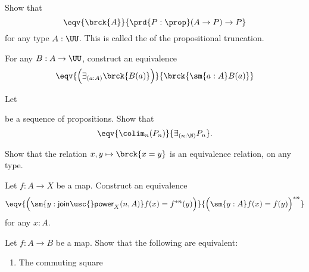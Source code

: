 \begin{exercises}
\item Show that
\begin{equation*}
\eqv{\brck{A}}{\prd{P:\prop}(A\to P)\to P}
\end{equation*}
for any type $A:\UU$. This is called the  of the propositional truncation.
\item For any $B:A\to\UU$, construct an equivalence
\begin{equation*}
\eqv{\Big(\exists_{(a:A)}\brck{B(a)}\Big)}{\brck{\sm{a:A}B(a)}}
\end{equation*}
\item Let
be a sequence of propositions. Show that
\begin{equation*}
\eqv{\colim_n(P_n)}{\exists_{(n:\N)} P_n}.
\end{equation*}
\item Show that the relation $x,y\mapsto\brck{x=y}$ is an equivalence relation, on any type.
\item Let $f:A\to X$ be a map. Construct an equivalence
\begin{equation*}
\eqv{\Big(\sm{y:\mathsf{join\usc{}power}_X(n,A)}f(x)=f^{\ast n}(y)\Big)}{\Big(\sm{y:A}f(x)=f(y)\Big)^{\ast n}}
\end{equation*}
for any $x:A$.
\item Let $f:A\to B$ be a map. Show that the following are equivalent:
\begin{enumerate}
\item The commuting square
\begin{equation*}

\end{equation*}
\end{enumerate}
\end{exercises}
